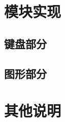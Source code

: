 \documentclass{ctexart}
\begin{document}
\section{模块实现}

\subsection{键盘部分}

\subsection{图形部分}



\section{其他说明}
\end{document}
